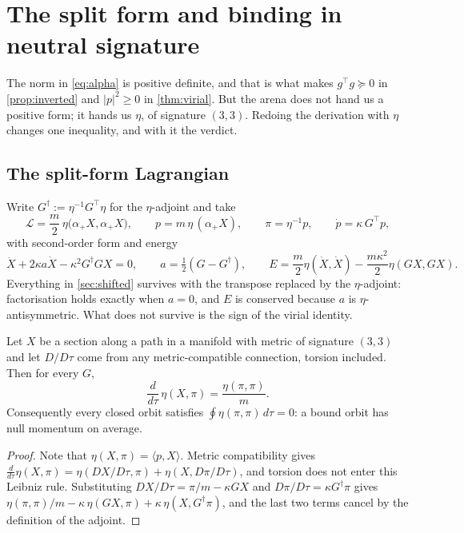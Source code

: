 \section{The split form and binding in neutral signature}
\label{sec:neutral}

The norm in \eqref{eq:alpha} is positive definite, and that is what makes $g^{\!\top}g\succeq0$ in \cref{prop:inverted} and $|p|^2\ge0$ in
\cref{thm:virial}. But the arena does not hand us a positive form; it hands us $\eta$, of signature $(3,3)$. Redoing the derivation with
$\eta$ changes one inequality, and with it the verdict.

\subsection{The split-form Lagrangian}

Write $G^\dagger:=\eta^{-1}G^{\!\top}\eta$ for the $\eta$-adjoint and take
\begin{equation}
\label{eq:splitL}
\mathcal L=\frac m2\,\eta\bigl(\alpha_+X,\alpha_+X\bigr),\qquad p=m\,\eta\,(\alpha_+X),\qquad \pi=\eta^{-1}p,\qquad \dot p=\kappa\,G^{\!\top}p ,
\end{equation}
with second-order form and energy
\begin{equation}
\label{eq:splitEg}
\ddot X+2\kappa a\dot X-\kappa^2G^\dagger GX=0,\qquad a=\tfrac12(G-G^\dagger),\qquad E=\frac m2\eta(\dot X,\dot X)-\frac{m\kappa^2}2\eta(GX,GX).
\end{equation}
Everything in \cref{sec:shifted} survives with the transpose replaced by the $\eta$-adjoint: factorisation holds exactly when $a=0$, and $E$
is conserved because $a$ is $\eta$-antisymmetric. What does not survive is the sign of the virial identity.

\begin{theorem}
\label{thm:splitvirial}
Let $X$ be a section along a path in a manifold with metric of signature $(3,3)$ and let $D/D\tau$ come from any metric-compatible connection,
torsion included. Then for every $G$,
\begin{equation}
\label{eq:splitvirial}
\frac{d}{d\tau}\,\eta(X,\pi)=\frac{\eta(\pi,\pi)}m .
\end{equation}
Consequently every closed orbit satisfies $\oint\eta(\pi,\pi)\,d\tau=0$: a bound orbit has null momentum on average.
\end{theorem}

\begin{proof}
Note that $\eta(X,\pi)=\langle p,X\rangle$. Metric compatibility gives $\tfrac{d}{d\tau}\eta(X,\pi)=\eta(DX/D\tau,\pi)+\eta(X,D\pi/D\tau)$, and torsion does
not enter this Leibniz rule. Substituting $DX/D\tau=\pi/m-\kappa GX$ and $D\pi/D\tau=\kappa G^\dagger\pi$ gives $\eta(\pi,\pi)/m-\kappa\,\eta(GX,\pi)+\kappa\,\eta(X,G^\dagger\pi)$,
and the last two terms cancel by the definition of the adjoint.
\end{proof}

